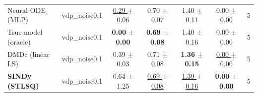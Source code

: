 \begin{tabular}{llccccc}
\midrule
Neural ODE (MLP) & vdp\_noise0.1 & \underline{0.29 $\pm$ 0.06} & 0.70 $\pm$ 0.07 & 1.40 $\pm$ 0.11 & 0.00 $\pm$ 0.00 & 5 \\
True model (oracle) & vdp\_noise0.1 & \textbf{0.00 $\pm$ 0.00} & \textbf{0.69 $\pm$ 0.08} & 1.40 $\pm$ 0.16 & 0.00 $\pm$ 0.00 & 5 \\
DMDc (linear LS) & vdp\_noise0.1 & 0.39 $\pm$ 0.03 & 0.71 $\pm$ 0.08 & \textbf{1.36 $\pm$ 0.15} & \underline{0.00 $\pm$ 0.00} & 5 \\
\textbf{SINDy (STLSQ)} & vdp\_noise0.1 & 0.64 $\pm$ 1.25 & \underline{0.69 $\pm$ 0.08} & \underline{1.39 $\pm$ 0.16} & \textbf{0.00 $\pm$ 0.00} & 5 \\
\bottomrule
\end{tabular}
